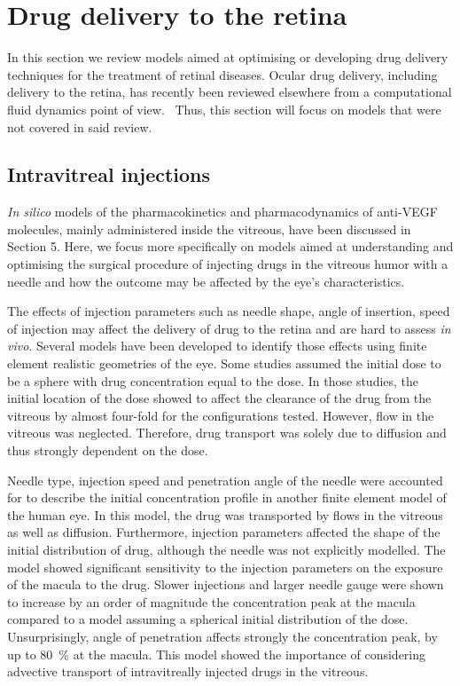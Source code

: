 \documentclass[12pt,a4paper]{journal}
\begin{document}
\section*{Drug delivery to the retina}

In this section we review models aimed at optimising or developing drug delivery techniques for the treatment of retinal diseases.
Ocular drug delivery, including delivery to the retina, has recently been reviewed elsewhere from a computational fluid dynamics point of view.~\cite{Bhandari_2021}
Thus, this section will focus on models that were not covered in said review.

\subsection*{Intravitreal injections}

\textit{In silico} models of the pharmacokinetics and pharmacodynamics of anti-VEGF molecules, mainly administered inside the vitreous, have been discussed in Section 5.
Here, we focus more specifically on models aimed at understanding and optimising the surgical procedure of injecting drugs in the vitreous humor with a needle and how the outcome may be affected by the eye's characteristics.

The effects of injection parameters such as needle shape, angle of insertion, speed of injection may affect the delivery of drug to the retina and are hard to assess \textit{in vivo}.
Several models have been developed to identify those effects using finite element realistic geometries of the eye.
Some studies assumed the initial dose to be a sphere with drug concentration equal to the dose.\cite{Friedrich_1997,Friedrich_1997a}
In those studies, the initial location of the dose showed to affect the clearance of the drug from the vitreous by almost four-fold for the configurations tested.\cite{Friedrich_1997}
However, flow in the vitreous was neglected.
Therefore, drug transport was solely due to diffusion and thus strongly dependent on the dose.\cite{Friedrich_1997}

Needle type, injection speed and penetration angle of the needle were accounted for to describe the initial concentration profile in another finite element model of the human eye.\cite{Jooybar_2014}
In this model, the drug was transported by flows in the vitreous as well as diffusion.
Furthermore, injection parameters affected the shape of the initial distribution of drug, although the needle was not explicitly modelled.
The model showed significant sensitivity to the injection parameters on the exposure of the macula to the drug.
Slower injections and larger needle gauge were shown to increase by an order of magnitude the concentration peak at the macula compared to a model assuming a spherical initial distribution of the dose.
Unsurprisingly, angle of penetration affects strongly the concentration peak, by up to \SI{80}{\percent} at the macula.\cite{Jooybar_2014}
This model showed the importance of considering advective transport of intravitreally injected drugs in the vitreous. 
\end{document}
